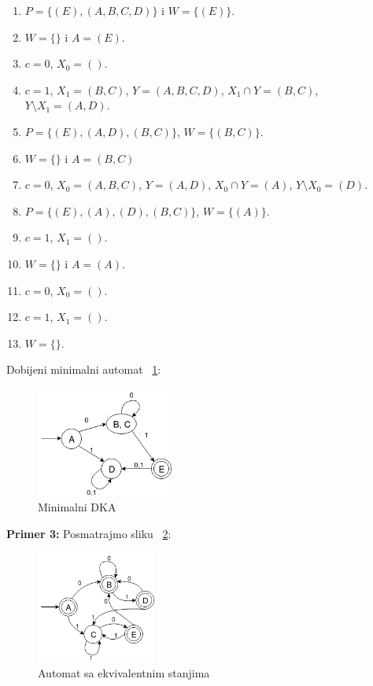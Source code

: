 \documentclass[a4paper]{article}
\begin{document}
\begin{enumerate}
\item $P = \{(E), (A, B, C, D)\}$ i $W = \{(E)\}$.
\item $W = \{\}$ i $A = (E)$.
\item $c = 0$, $X_{0} = ()$.
\item $c = 1$, $X_{1} = (B, C)$, $Y = (A, B, C, D)$, $X_{1} \cap Y = (B, C)$, $Y \setminus X_{1} = (A, D)$.
\item $P = \{(E), (A, D), (B, C)\}$, $W = \{(B, C)\}$.
\item $W = \{\}$ i $A = (B, C)$
\item $c = 0$, $X_{0} = (A, B, C)$, $Y = (A, D)$, $X_{0} \cap Y = (A)$, $Y \setminus X_{0} = (D)$.
\item $P = \{(E), (A), (D), (B, C)\}$, $W = \{(A)\}$.
\item $c = 1$, $X_{1} = ()$.
\item $W = \{\}$ i $A = (A)$.
\item $c = 0$, $X_{0} = ()$.
\item $c = 1$, $X_{1} = ()$.
\item $W = \{\}$.
\end{enumerate}

Dobijeni minimalni automat ~\ref{fig:slika4}: 

\begin{figure}[H]
\centering
\includegraphics[width=0.4\textwidth]{Slike/autom4.png}
\caption{\label{fig:slika4}Minimalni DKA}
\end{figure}

\newpage

\noindent \textbf{Primer 3:}
Posmatrajmo sliku ~\ref{fig:slika5}:

\begin{figure}[H]
\centering
\includegraphics[width=0.35\textwidth]{Slike/autom5.png}
\caption{\label{fig:slika5}Automat sa ekvivalentnim stanjima}
\end{figure}
\end{document}
